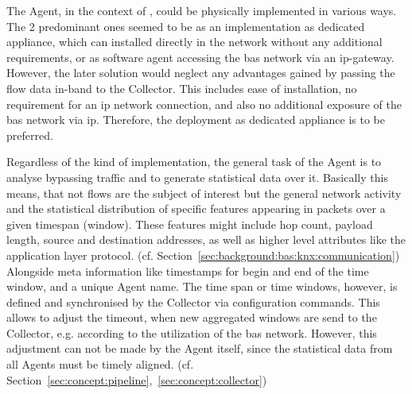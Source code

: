The Agent, in the context of , could be physically implemented in various ways.
The 2 predominant ones seemed to be as an implementation as dedicated appliance, which can installed directly in the network without any additional requirements, or as software agent accessing the \gls{bas} network via an \gls{ip}-gateway.
However, the later solution would neglect any advantages gained by passing the flow data in-band to the Collector. This includes ease of installation, no requirement for an \gls{ip} network connection, and also no additional exposure of the \gls{bas} network via \gls{ip}.
Therefore, the deployment as dedicated appliance is to be preferred.

Regardless of the kind of implementation, the general task of the Agent is to analyse bypassing traffic and to generate statistical data over it.
Basically this means, that not flows are the subject of interest but the general network activity and the statistical distribution of specific features appearing in packets over a given timespan (window).
These features might include hop count, payload length, source and destination addresses, as well as higher level attributes like the application layer protocol. (cf. Section~\ref{sec:background:bas:knx:communication}) Alongside meta information like timestamps for begin and end of the time window, and a unique Agent name.
The time span or time windows, however, is defined and synchronised by the Collector via configuration commands. This allows to adjust the timeout, when new aggregated windows are send to the Collector, e.g. according to the utilization of the \gls{bas} network.
However, this adjustment can not be made by the Agent itself, since the statistical data from all Agents must be timely aligned. (cf. Section~\ref{sec:concept:pipeline},~\ref{sec:concept:collector})

